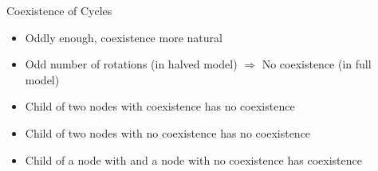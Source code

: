 


\begin{frame}{Coexistence of Cycles}
	\begin{itemize}
		\item Oddly enough, coexistence more natural
		\item Odd number of rotations (in halved model) $\Rightarrow$ No coexistence (in full model)
		      \vspace{1em}
		\item Child of two nodes with coexistence has no coexistence
		\item Child of two nodes with no coexistence has no coexistence
		\item Child of a node with and a node with no coexistence has coexistence
	\end{itemize}

\end{frame}

